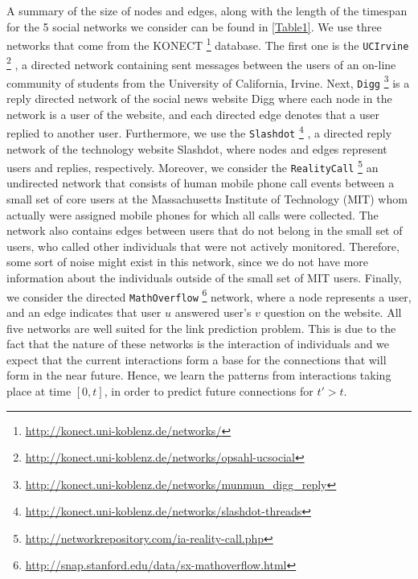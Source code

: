 \documentclass{acm_proc_article-sp}
\begin{document}
A summary of the size of nodes and edges, along with the length of the timespan for the 5 social networks we consider can be found in \autoref{Table1}. We use three networks that come from the KONECT \footnote{\url{http://konect.uni-koblenz.de/networks/}} database. The first one is the \texttt{UCIrvine} \footnote{\url{http://konect.uni-koblenz.de/networks/opsahl-ucsocial}} \cite{opsahl2009clustering}, a directed network containing sent messages between the users of an on-line community of students from the University of California, Irvine. Next, \texttt{Digg} \footnote{\url{http://konect.uni-koblenz.de/networks/munmun_digg_reply}}\cite{de2009social} is a reply directed network of the social news website Digg where each node in the network is a user of the website, and each directed edge denotes that a user replied to another user. Furthermore, we use the \texttt{Slashdot} \footnote{\url{http://konect.uni-koblenz.de/networks/slashdot-threads}} \cite{gomez2008statistical}, a directed reply network of the technology website Slashdot, where nodes and edges represent users and replies, respectively. Moreover, we consider the \texttt{RealityCall} \footnote{\url{http://networkrepository.com/ia-reality-call.php}} \cite{eagle2006reality, nr} an undirected network that consists of human mobile phone call events between a small set of core users at the Massachusetts Institute of Technology (MIT) whom actually were assigned mobile phones for which all calls were collected. The network also contains edges between users that do not belong in the small set of users, who called other individuals that were not actively monitored. Therefore, some sort of noise might exist in this network, since we do not have more information about the individuals outside of the small set of MIT users. Finally, we consider the directed \texttt{MathOverflow} \footnote{\url{http://snap.stanford.edu/data/sx-mathoverflow.html}} \cite{Paranjape:2017:MTN:3018661.3018731} network, where a node represents a user, and an edge indicates that user $u$ answered user's $v$ question on the website. All five networks are well suited for the link prediction problem. This is due to the fact that the nature of these networks is the interaction of individuals and we expect that the current interactions form a base for the connections that will form in the near future. Hence, we learn the patterns from interactions taking place at time $[0,t]$, in order to predict future connections for $t' > t$.

\begin{table}
	\centering
	\caption{Number of nodes, edges, and length of timespan for the 5 social networks.}
	\label{Table1}
\end{table}
\end{document}
